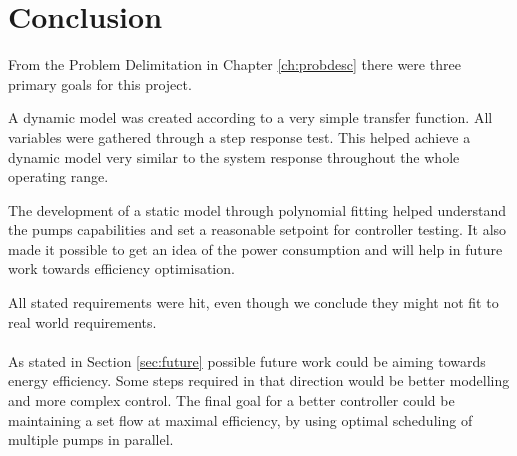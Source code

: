 \chapter{Conclusion}\label{ch:conclusion}

From the Problem Delimitation in Chapter \ref{ch:probdesc} there were three primary goals for this project.

A dynamic model was created according to a very simple transfer function.
All variables were gathered through a step response test.
This helped achieve a dynamic model very similar to the system response throughout the whole operating range.

The development of a static model through polynomial fitting helped understand the pumps capabilities and set a reasonable setpoint for controller testing.
It also made it possible to get an idea of the power consumption and will help in future work towards efficiency optimisation.

All stated requirements were hit,
even though we conclude they might not fit to \cite{Franklin2014} real world requirements.
\\
\\
As stated in Section \ref{sec:future} possible future work could be aiming towards energy efficiency.
Some steps required in that direction would be better modelling and more complex control.
The final goal for a better controller could be maintaining a set flow at maximal efficiency,
by using optimal scheduling of multiple pumps in parallel.
